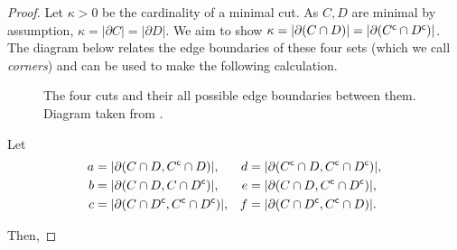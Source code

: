 \begin{proof}
    Let \(\kappa>0\) be the cardinality of a minimal cut. As \(C, D\) are minimal by assumption, \(\kappa = |\partial C| = |\partial D|\).
    We aim to show \(\kappa = |\partial(C \cap D)| = |\partial({C}^{\mathsf{c}} \cap {D}^{\mathsf{c}})|\).
    The diagram below relates the edge boundaries of these four sets (which we call \emph{corners}) and can be used to make the following calculation.

    \begin{figure}[h]
    \centering
    \caption{The four cuts and their all possible edge boundaries between them. Diagram taken from \cite[p.~4]{Kr90}.}
    \label{fig:cuts}
    \end{figure}

    Let 
    \begin{align*}
        a &= |\partial(C \cap D, {C}^{\mathsf{c}} \cap D)|, & d &= |\partial({C}^{\mathsf{c}} \cap D, {C}^{\mathsf{c}} \cap {D}^{\mathsf{c}})|, \\
        b &= |\partial(C \cap D, C \cap {D}^{\mathsf{c}})|, & e &= |\partial(C \cap D, {C}^{\mathsf{c}} \cap {D}^{\mathsf{c}})|, \\
        c &= |\partial(C \cap {D}^{\mathsf{c}}, {C}^{\mathsf{c}} \cap {D}^{\mathsf{c}})|, & f &= |\partial(C \cap {D}^{\mathsf{c}}, {C}^{\mathsf{c}} \cap D)|.
    \end{align*}

    Then, 


\end{proof}
